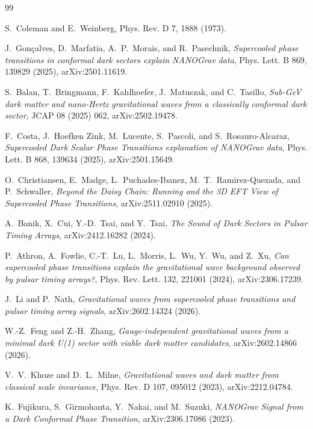 \documentclass[a4paper,11pt]{article}
\begin{document}
\begin{thebibliography}{99}

S.~Coleman and E.~Weinberg, Phys. Rev. D 7, 1888 (1973).

J.~Gon\c{c}alves, D.~Marfatia, A.~P.~Morais, and R.~Pasechnik,
\emph{Supercooled phase transitions in conformal dark sectors explain NANOGrav data},
Phys. Lett. B 869, 139829 (2025), arXiv:2501.11619.

S.~Balan, T.~Bringmann, F.~Kahlhoefer, J.~Matuszak, and C.~Tasillo,
\emph{Sub-GeV dark matter and nano-Hertz gravitational waves from a classically conformal dark sector},
JCAP 08 (2025) 062, arXiv:2502.19478.

F.~Costa, J.~Hoefken Zink, M.~Lucente, S.~Pascoli, and S.~Rosauro-Alcaraz,
\emph{Supercooled Dark Scalar Phase Transitions explanation of NANOGrav data},
Phys. Lett. B 868, 139634 (2025), arXiv:2501.15649.

O.~Christiansen, E.~Madge, L.~Puchades-Ibanez, M.~T.~Ramirez-Quezada, and P.~Schwaller,
\emph{Beyond the Daisy Chain: Running and the 3D EFT View of Supercooled Phase Transitions},
arXiv:2511.02910 (2025).

A.~Banik, X.~Cui, Y.-D.~Tsai, and Y.~Tsai,
\emph{The Sound of Dark Sectors in Pulsar Timing Arrays},
arXiv:2412.16282 (2024).

P.~Athron, A.~Fowlie, C.-T.~Lu, L.~Morris, L.~Wu, Y.~Wu, and Z.~Xu,
\emph{Can supercooled phase transitions explain the gravitational wave background observed by pulsar timing arrays?},
Phys. Rev. Lett. 132, 221001 (2024), arXiv:2306.17239.

J.~Li and P.~Nath,
\emph{Gravitational waves from supercooled phase transitions and pulsar timing array signals},
arXiv:2602.14324 (2026).

W.-Z.~Feng and Z.-H.~Zhang,
\emph{Gauge-independent gravitational waves from a minimal dark U(1) sector with viable dark matter candidates},
arXiv:2602.14866 (2026).

V.~V.~Khoze and D.~L.~Milne,
\emph{Gravitational waves and dark matter from classical scale invariance},
Phys. Rev. D 107, 095012 (2023), arXiv:2212.04784.

K.~Fujikura, S.~Girmohanta, Y.~Nakai, and M.~Suzuki,
\emph{NANOGrav Signal from a Dark Conformal Phase Transition},
arXiv:2306.17086 (2023).


\end{thebibliography}
\end{document}
